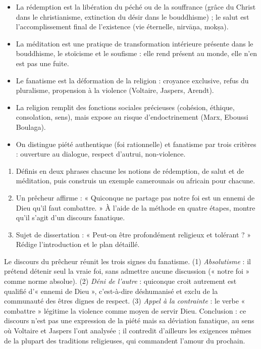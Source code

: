\documentclass[11pt]{article}
\newcommand{\cle}[1]{{\popxbold\color{popdark}#1}}
\begin{document}
\begin{aretenir}
\begin{itemize}
\item La \cle{rédemption} est la libération du péché ou de la souffrance (grâce du Christ dans le christianisme, extinction du désir dans le bouddhisme) ; le \cle{salut} est l'accomplissement final de l'existence (vie éternelle, nirvāṇa, mokṣa).
\item La \cle{méditation} est une pratique de transformation intérieure présente dans le bouddhisme, le stoïcisme et le soufisme : elle rend présent au monde, elle n'en est pas une fuite.
\item Le \cle{fanatisme} est la déformation de la religion : croyance exclusive, refus du pluralisme, propension à la violence (Voltaire, Jaspers, Arendt).
\item La religion remplit des fonctions sociales précieuses (cohésion, éthique, consolation, sens), mais expose au risque d'endoctrinement (Marx, Eboussi Boulaga).
\item On distingue piété authentique (foi rationnelle) et fanatisme par trois critères : ouverture au dialogue, respect d'autrui, non-violence.
\end{itemize}
\end{aretenir}

\begin{exercice}
\begin{enumerate}
\item Définis en deux phrases chacune les notions de rédemption, de salut et de méditation, puis construis un exemple camerounais ou africain pour chacune.
\item Un prêcheur affirme : « Quiconque ne partage pas notre foi est un ennemi de Dieu qu'il faut combattre. » À l'aide de la méthode en quatre étapes, montre qu'il s'agit d'un discours fanatique.
\item Sujet de dissertation : « Peut-on être profondément religieux et tolérant ? » Rédige l'introduction et le plan détaillé.
\end{enumerate}
\end{exercice}

\begin{corrige}[Exercice 2]
Le discours du prêcheur réunit les trois signes du fanatisme. (1) \emph{Absolutisme} : il prétend détenir seul la vraie foi, sans admettre aucune discussion (« notre foi » comme norme absolue). (2) \emph{Déni de l'autre} : quiconque croit autrement est qualifié d'« ennemi de Dieu », c'est-à-dire déshumanisé et exclu de la communauté des êtres dignes de respect. (3) \emph{Appel à la contrainte} : le verbe « combattre » légitime la violence comme moyen de servir Dieu. Conclusion : ce discours n'est pas une expression de la piété mais sa déviation fanatique, au sens où Voltaire et Jaspers l'ont analysée ; il contredit d'ailleurs les exigences mêmes de la plupart des traditions religieuses, qui commandent l'amour du prochain.
\end{corrige}
\end{document}
